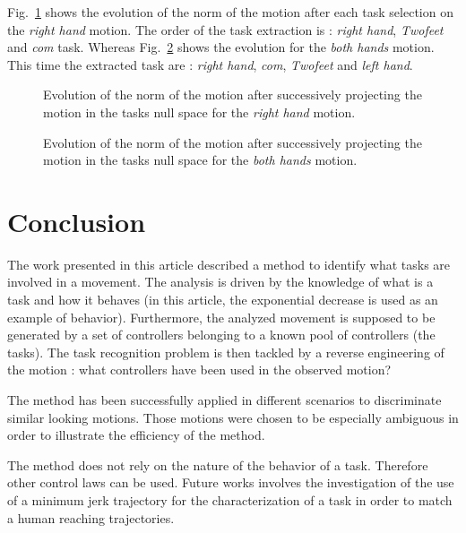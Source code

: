 \documentclass[letterpaper, 10pt, conference]{ieeeconf}      %
\begin{document}
Fig.~\ref{fig:exp1:PqdotNormsR} shows the evolution of the norm of the motion after each task selection
on the \emph{right hand} motion. The order of the task extraction is :
\emph{right hand}, \emph{Twofeet} and \emph{com} task.
Whereas Fig.~\ref{fig:exp1:PqdotNormsRL} shows the evolution for the \emph{both hands} motion.
This time the extracted task are : \emph{right hand},  \emph{com}, \emph{Twofeet} and \emph{left hand}.

\begin{figure}[t]
  \resizebox{.48\textwidth}{!} {
    
  }
\caption{Evolution of the norm of the motion after successively projecting the motion in the tasks null space for
the \emph{right hand} motion.}
\label{fig:exp1:PqdotNormsR}
\end{figure}

\begin{figure}[t]
  \resizebox{.48\textwidth}{!} {
    
  }
\caption{Evolution of the norm of the motion after successively projecting the motion in the tasks null space for
the \emph{both hands} motion.}
\label{fig:exp1:PqdotNormsRL}
\end{figure}

\section{Conclusion}
The work presented in this article described a method to identify what tasks are involved in a movement.
The analysis is driven by the knowledge
of what is a task and how it behaves (in this article, the exponential decrease is used as an example of behavior). 
Furthermore, the analyzed movement is supposed to be generated by a set of 
controllers belonging to a known pool of controllers (the tasks). 
The task recognition problem is then tackled by a reverse engineering of the motion :
what controllers have been used in the observed motion?

The method has been successfully applied in different
scenarios to discriminate similar looking motions. Those motions were chosen to be especially
ambiguous in order to illustrate the efficiency of the method.

The method does not rely on the nature of the behavior of a task. Therefore
other control laws can be used. Future works involves the investigation of the use of 
a minimum jerk trajectory for the characterization of a task in order to match
a human reaching trajectories. 



\end{document}

